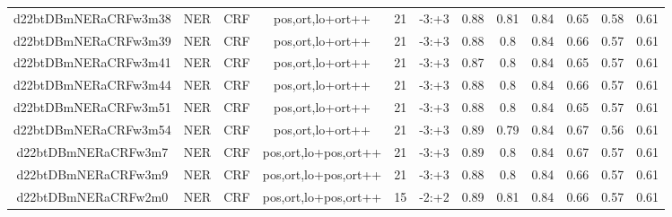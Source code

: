 \documentclass[a4paper]{article}
\begin{document}
\begin{landscape}
\begin{center}
\begin{tabular}{ |c|c|c|c|c|c|c|c|c|c|c|c|}
 	

 
 	
 	\small{ d22btDBmNERaCRFw3m38 } & \small{ NER} & \small{  CRF }  & pos,ort,lo+ort++  &  21 &  \small{  -3:+3 }  &  0.88 & 0.81 & 0.84  &  0.65 & 0.58 & 0.61 \\
 	

 
 	
 	\small{ d22btDBmNERaCRFw3m39 } & \small{ NER} & \small{  CRF }  & pos,ort,lo+ort++  &  21 &  \small{  -3:+3 }  &  0.88 & 0.8 & 0.84  &  0.66 & 0.57 & 0.61 \\
 	

 
 	
 	\small{ d22btDBmNERaCRFw3m41 } & \small{ NER} & \small{  CRF }  & pos,ort,lo+ort++  &  21 &  \small{  -3:+3 }  &  0.87 & 0.8 & 0.84  &  0.65 & 0.57 & 0.61 \\
 	

 
 	
 	\small{ d22btDBmNERaCRFw3m44 } & \small{ NER} & \small{  CRF }  & pos,ort,lo+ort++  &  21 &  \small{  -3:+3 }  &  0.88 & 0.8 & 0.84  &  0.66 & 0.57 & 0.61 \\
 	

 
 	
 	\small{ d22btDBmNERaCRFw3m51 } & \small{ NER} & \small{  CRF }  & pos,ort,lo+ort++  &  21 &  \small{  -3:+3 }  &  0.88 & 0.8 & 0.84  &  0.65 & 0.57 & 0.61 \\
 	

 
 	
 	\small{ d22btDBmNERaCRFw3m54 } & \small{ NER} & \small{  CRF }  & pos,ort,lo+ort++  &  21 &  \small{  -3:+3 }  &  0.89 & 0.79 & 0.84  &  0.67 & 0.56 & 0.61 \\
 	

 
 	
 	\small{ d22btDBmNERaCRFw3m7 } & \small{ NER} & \small{  CRF }  & pos,ort,lo+pos,ort++  &  21 &  \small{  -3:+3 }  &  0.89 & 0.8 & 0.84  &  0.67 & 0.57 & 0.61 \\
 	

 
 	
 	\small{ d22btDBmNERaCRFw3m9 } & \small{ NER} & \small{  CRF }  & pos,ort,lo+pos,ort++  &  21 &  \small{  -3:+3 }  &  0.88 & 0.8 & 0.84  &  0.66 & 0.57 & 0.61 \\
 	

 
 	
 	\small{ d22btDBmNERaCRFw2m0 } & \small{ NER} & \small{  CRF }  & pos,ort,lo+pos,ort++  &  15 &  \small{  -2:+2 }  &  0.89 & 0.81 & 0.84  &  0.66 & 0.57 & 0.61 \\
 	


\end{tabular}
\end{center}
\end{landscape}
\end{document}
